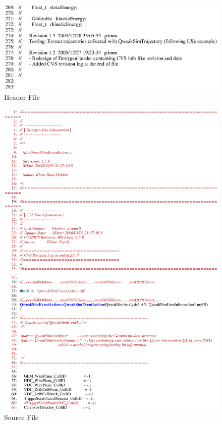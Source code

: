 \clearpage

\begin{figure}[h]
  \hspace{0cm}
  \includegraphics[scale=0.8]{./figures13/QweakSimEventAction.hh-p5.eps}
  \caption{Header File}
           \label{fig:XIII-SC-15}
\end{figure}

\clearpage

\begin{figure}[h]
  \hspace{0cm}
  \includegraphics[scale=0.8]{./figures13/QweakSimEventAction.cc-p1.eps}
  \caption{Source File}
           \label{fig:XIII-SC-16}
\end{figure}


